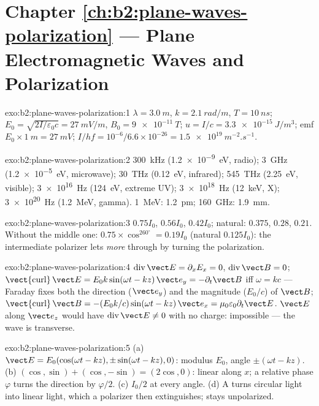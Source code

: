 \section*{Chapter \ref{ch:b2:plane-waves-polarization} --- Plane Electromagnetic Waves and Polarization}

\begin{solution}{exo:b2:plane-waves-polarization:1}
$\lambda = \qty{3.0}{m}$, $k = \qty{2.1}{rad/m}$, $T = \qty{10}{ns}$; $E_0 = \sqrt{2I/\varepsilon_0c}
= \qty{27}{mV/m}$, $B_0 = \qty{9e-11}{T}$; $u = I/c = \qty{3.3e-15}{J/m^3}$; emf
$E_0 \times \qty{1}{m} = \qty{27}{mV}$; $I/hf = 10^{-6}/6.6 \times 10^{-26} = \qty{1.5e19}{m^{-2}.s^{-1}}$.
\end{solution}

\begin{solution}{exo:b2:plane-waves-polarization:2}
\qty{300}{kHz} (\qty{1.2e-9}{eV}, radio); \qty{3}{GHz} (\qty{1.2e-5}{eV}, microwave);
\qty{30}{THz} (\qty{0.12}{eV}, infrared); \qty{545}{THz} (\qty{2.25}{eV}, visible);
\qty{3e16}{Hz} (\qty{124}{eV}, extreme UV); \qty{3e18}{Hz} (\qty{12}{keV}, X);
\qty{3e20}{Hz} (\qty{1.2}{MeV}, gamma). \qty{1}{MeV}: \qty{1.2}{pm}; \qty{160}{GHz}: \qty{1.9}{mm}.
\end{solution}

\begin{solution}{exo:b2:plane-waves-polarization:3}
$0.75I_0$, $0.56I_0$, $0.42I_0$; natural: $0.375$, $0.28$, $0.21$. Without the
middle one: $0.75 \times \cos^260^\circ = 0.19I_0$ (natural $0.125I_0$): the
intermediate polarizer lets \emph{more} through by turning the
polarization.
\end{solution}

\begin{solution}{exo:b2:plane-waves-polarization:4}
$\operatorname{div}\vect E = \partial_xE_x = 0$, $\operatorname{div}\vect B = 0$;
$\operatorname{\vect{curl}}\vect E = E_0k\sin(\omega t - kz)\,\vect e_y = -\partial_t\vect B$ iff $\omega =
kc$ --- Faraday fixes both the direction ($\vect e_y$) and the magnitude
($E_0/c$) of $\vect B$; $\operatorname{\vect{curl}}\vect B = -(E_0k/c)\sin(\omega t - kz)\,\vect e_x
= \mu_0\varepsilon_0\partial_t\vect E$. $\vect E$ along $\vect e_z$ would have $\operatorname{div}
\vect E \ne 0$ with no charge: impossible --- the wave is transverse.
\end{solution}

\begin{solution}{exo:b2:plane-waves-polarization:5}
(a) $\vect E = E_0(\cos(\omega t - kz), \pm\sin(\omega t - kz), 0)$: modulus $E_0$,
angle $\pm(\omega t - kz)$. (b) $(\cos, \sin) + (\cos, -\sin) = (2\cos, 0)$: linear
along $x$; a relative phase $\varphi$ turns the direction by $\varphi/2$. (c)
$I_0/2$ at every angle. (d) A  turns circular light
into linear light, which a polarizer then extinguishes; 
stays unpolarized.
\end{solution}

